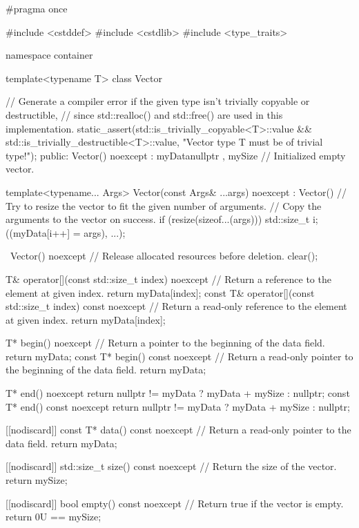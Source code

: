 \begin{cppcode}
#pragma once

#include <cstddef>
#include <cstdlib>
#include <type_traits>

namespace container
{
template<typename T>
class Vector
{
    // Generate a compiler error if the given type isn't trivially copyable or destructible,
    // since std::realloc() and std::free() are used in this implementation.
    static_assert(std::is_trivially_copyable<T>::value && std::is_trivially_destructible<T>::value,
        "Vector type T must be of trivial type!");
public:
    Vector() noexcept
        : myData{nullptr}
        , mySize{}
    {
        // Initialized empty vector.
    }

    template<typename... Args>
    Vector(const Args& ...args) noexcept
        : Vector()
    {
        // Try to resize the vector to fit the given number of arguments.
        // Copy the arguments to the vector on success.
        if (resize(sizeof...(args)))
        {
            std::size_t i{};
            ((myData[i++] = args), ...);
        }
    }

    ~Vector() noexcept
    {
        // Release allocated resources before deletion.
        clear();
    }

    T& operator[](const std::size_t index) noexcept
    {
        // Return a reference to the element at given index.
        return myData[index];
    }
    const T& operator[](const std::size_t index) const noexcept
    {
        // Return a read-only reference to the element at given index.
        return myData[index];
    }

    T* begin() noexcept
    {
        // Return a pointer to the beginning of the data field.
        return myData;
    }
    const T* begin() const noexcept
    {
        // Return a read-only pointer to the beginning of the data field.
        return myData;
    }

    T* end() noexcept { return nullptr != myData ? myData + mySize : nullptr; }
    const T* end() const noexcept { return nullptr != myData ? myData + mySize : nullptr; }

    [[nodiscard]] const T* data() const noexcept
    {
        // Return a read-only pointer to the data field.
        return myData;
    }

    [[nodiscard]] std::size_t size() const noexcept
    {
        // Return the size of the vector.
        return mySize;
    }

    [[nodiscard]] bool empty() const noexcept
    {
        // Return true if the vector is empty.
        return 0U == mySize;
    }

}}
\end{cppcode}
